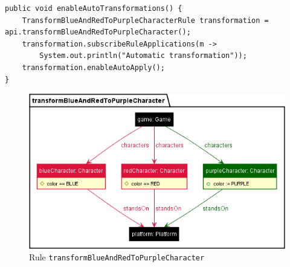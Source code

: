 \begin{lstlisting}[caption={Instant Automatic Rule Application}, label={listing:instant-application}]
public void enableAutoTransformations() {
	TransformBlueAndRedToPurpleCharacterRule transformation = api.transformBlueAndRedToPurpleCharacter();
	transformation.subscribeRuleApplications(m -> 
		System.out.println("Automatic transformation"));
	transformation.enableAutoApply();
}
\end{lstlisting}

\begin{figure}[h!]
	\centering
	\includegraphics[scale=0.7]{../common/figures/rule-transformBlueAndRedToPurpleCharacter}
	\caption{Rule \texttt{transformBlueAndRedToPurpleCharacter}}
	\label{fig:rule-transformBlueAndRedToPurpleCharacter}
\end{figure}
